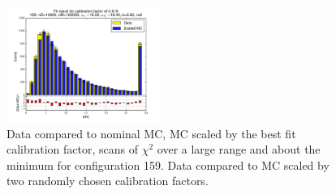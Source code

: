 \begin{figure}[htbp]
\begin{center}
\includegraphics[width=0.45\textwidth]{../FIGURES/159/FIG_Fit_result_for_calibration_factor_of_0_819.pdf} 
\caption{Data compared to nominal MC, MC scaled by the best fit calibration factor, scans of $\chi^2$ over a large range and about the minimum for configuration 159. Data compared to MC scaled by two randomly chosen calibration factors.} 
\label{tab:best_159} 
\end{center} \end{figure} 


